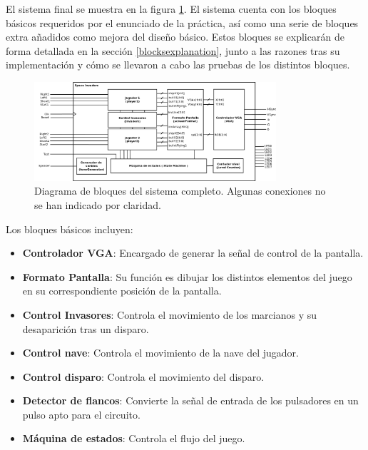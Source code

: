 \label{generalBehavior}

El sistema final se muestra en la figura \ref{fig:spaceinvblock}. El sistema cuenta con los bloques básicos requeridos por el enunciado de la práctica, así como una serie de bloques extra añadidos como mejora del diseño básico. Estos bloques se explicarán de forma detallada en la sección \ref{blocksexplanation}, junto a las razones tras su implementación y cómo se llevaron a cabo las pruebas de los distintos bloques.

\begin{figure}[H]
	\centering
	\includegraphics[width=0.8\textwidth]{spaceinvaders.png}
	\caption{Diagrama de bloques del sistema completo. Algunas conexiones no se han indicado por claridad. }\label{fig:spaceinvblock}
\end{figure}

Los bloques básicos incluyen:
\begin{itemize}
	\item {\bfseries Controlador VGA}: Encargado de generar la señal de control de la pantalla.
	\item {\bfseries Formato Pantalla}: Su función es dibujar los distintos elementos del juego en su correspondiente posición de la pantalla.
	\item {\bfseries Control Invasores}: Controla el movimiento de los marcianos y su desaparición tras un disparo.
	\item {\bfseries Control nave}: Controla el movimiento de la nave del jugador.
	\item {\bfseries Control disparo}: Controla el movimiento del disparo.
	\item {\bfseries Detector de flancos}: Convierte la señal de entrada de los pulsadores en un pulso apto para el circuito.
	\item {\bfseries Máquina de estados}: Controla el flujo del juego.
\end{itemize}

